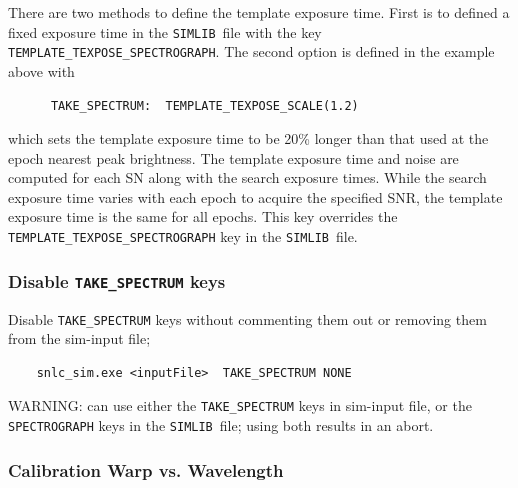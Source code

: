 \documentclass[12pt]{article}
\newcommand{\SPEC}{{\tt SPECTROGRAPH}}
\newcommand{\simlib}{{\tt SIMLIB}}
\begin{document}
\medskip
There are two methods to define the template exposure time.
First is to defined a fixed exposure time in the \simlib\ file
with the key {\tt TEMPLATE\_TEXPOSE\_SPECTROGRAPH}.
The second option is defined in the example above with
%
\vspace{-0.4cm}
\begin{verbatim}
      TAKE_SPECTRUM:  TEMPLATE_TEXPOSE_SCALE(1.2)
\end{verbatim}
%
which sets the template exposure time to be 20\% longer than
that used at the epoch nearest peak brightness. 
The template exposure time and noise are computed for each SN
along with the search exposure times. While the search
exposure time varies with each epoch to acquire the specified
SNR, the template exposure time is the same for all epochs.
This key overrides the {\tt TEMPLATE\_TEXPOSE\_SPECTROGRAPH} 
key in the \simlib\ file.


\subsubsection{Disable {\tt TAKE\_SPECTRUM} keys}
\label{sss:disable_take_spectrum}

Disable {\tt TAKE\_SPECTRUM} keys without commenting them out or removing them from the 
sim-input file;
\vspace{-0.4cm}
\begin{verbatim}
    snlc_sim.exe <inputFile>  TAKE_SPECTRUM NONE
\end{verbatim}

\medskip
WARNING: can use either the {\tt TAKE\_SPECTRUM} keys in sim-input file,
or the {\SPEC} keys in the \simlib\ file; using both results in an abort.


\subsubsection{Calibration Warp vs. Wavelength}
\label{sss:SPEC_WARP}
\end{document}
